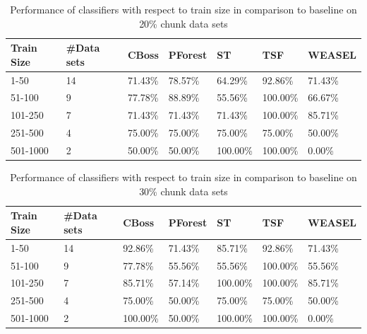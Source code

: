         \begin{table}[!ht]
            \setlength\extrarowheight{2pt} %
            \begin{tabularx}{\textwidth}{|X|X|X|X|X|X|X|}
            \hline
            \textbf{Train Size} & \textbf{\#Data sets} & \textbf{CBoss} & \textbf{PForest} & \textbf{ST} & \textbf{TSF} & \textbf{WEASEL} \\ \hline
                1-50 & 14 & 71.43\% & 78.57\% & 64.29\% & 92.86\% & 71.43\% \\ \hline
                51-100 & 9 & 77.78\% & 88.89\% & 55.56\% & 100.00\% & 66.67\% \\ \hline
                101-250 & 7 & 71.43\% & 71.43\% & 71.43\% & 100.00\% & 85.71\% \\ \hline
                251-500 & 4 & 75.00\% & 75.00\% & 75.00\% & 75.00\% & 50.00\% \\ \hline
                501-1000 & 2 &50.00\% & 50.00\% & 100.00\% & 100.00\% & 0.00\% \\ \hline
            \end{tabularx}
            \caption{Performance of classifiers with respect to train size in comparison to baseline on 20\% chunk data sets}
        \end{table}
        
        \begin{table}[!ht]
            \setlength\extrarowheight{2pt} %
            \begin{tabularx}{\textwidth}{|X|X|X|X|X|X|X|}
            \hline
            \textbf{Train Size} & \textbf{\#Data sets} & \textbf{CBoss} & \textbf{PForest} & \textbf{ST} & \textbf{TSF} & \textbf{WEASEL} \\ \hline
                1-50 & 14 & 92.86\% & 71.43\% & 85.71\% & 92.86\% & 71.43\% \\ \hline
                51-100 & 9 & 77.78\% & 55.56\% & 55.56\% & 100.00\% & 55.56\% \\ \hline
                101-250 & 7 & 85.71\% & 57.14\% & 100.00\% & 100.00\% & 85.71\% \\ \hline
                251-500 & 4 & 75.00\% & 50.00\% & 75.00\% & 75.00\% & 50.00\% \\ \hline
                501-1000 & 2 &100.00\% & 50.00\% & 100.00\% & 100.00\% & 0.00\% \\ \hline
            \end{tabularx}
            \caption{Performance of classifiers with respect to train size in comparison to baseline on 30\% chunk data sets}
        \end{table}
        

